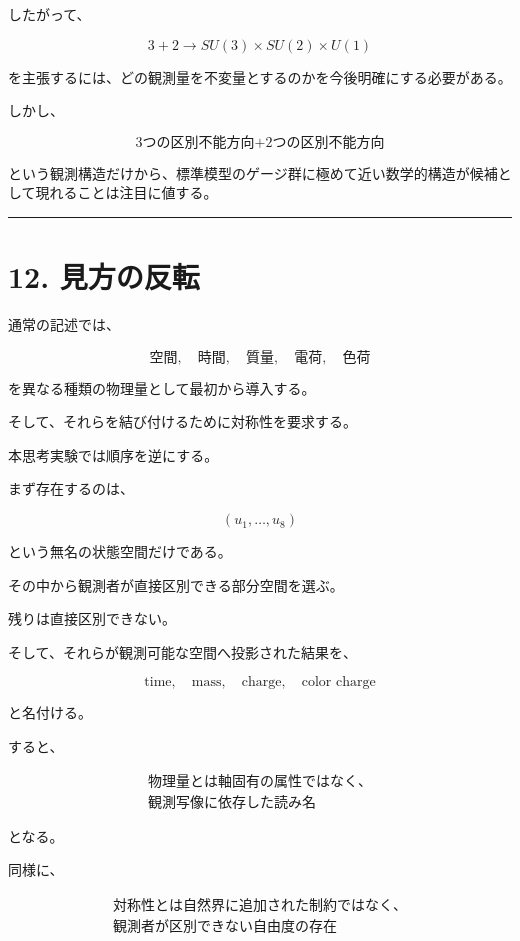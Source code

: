 \documentclass[
  a4paper,
]{ltjsarticle}
\begin{document}
したがって、

\[
3+2
\rightarrow
SU(3)\times SU(2)\times U(1)
\]

を主張するには、どの観測量を不変量とするのかを今後明確にする必要がある。

しかし、

\[
\boxed{
\text{3つの区別不能方向}
+
\text{2つの区別不能方向}
}
\]

という観測構造だけから、標準模型のゲージ群に極めて近い数学的構造が候補として現れることは注目に値する。

\begin{center}\rule{0.5\linewidth}{0.5pt}\end{center}

\section{12. 見方の反転}\label{ux898bux65b9ux306eux53cdux8ee2}

通常の記述では、

\[
\text{空間},
\quad
\text{時間},
\quad
\text{質量},
\quad
\text{電荷},
\quad
\text{色荷}
\]

を異なる種類の物理量として最初から導入する。

そして、それらを結び付けるために対称性を要求する。

本思考実験では順序を逆にする。

まず存在するのは、

\[
\boxed{
(u_1,\ldots,u_8)
}
\]

という無名の状態空間だけである。

その中から観測者が直接区別できる部分空間を選ぶ。

残りは直接区別できない。

そして、それらが観測可能な空間へ投影された結果を、

\[
\text{time},
\quad
\text{mass},
\quad
\text{charge},
\quad
\text{color charge}
\]

と名付ける。

すると、

\[
\boxed{
\begin{array}{c}
\text{物理量とは軸固有の属性ではなく、}\\
\text{観測写像に依存した読み名}
\end{array}
}
\]

となる。

同様に、

\[
\boxed{
\begin{array}{c}
\text{対称性とは自然界に追加された制約ではなく、}\\
\text{観測者が区別できない自由度の存在}
\end{array}
}
\]
\end{document}
